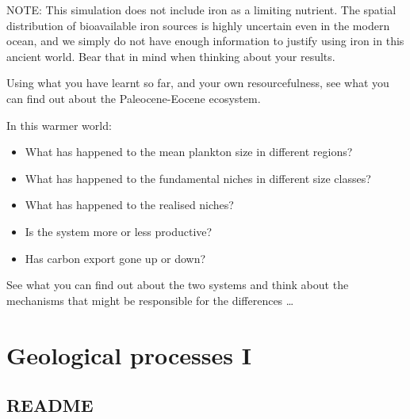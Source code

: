 \documentclass[11pt,fleqn]{book} %
\begin{document}
\noindent NOTE: This simulation does not include iron as a limiting nutrient. The spatial distribution of bioavailable iron sources is highly uncertain even in the modern ocean, and we simply do not have enough information to justify using iron in this ancient world. Bear that in mind when thinking about your results.

Using what you have learnt so far, and your own resourcefulness, see what you can find out about the Paleocene-Eocene ecosystem.

In this warmer world:

\vspace{2mm}
\begin{itemize}
\item What has happened to the mean plankton size in different regions?
\item What has happened to the fundamental niches in different size classes?
\item What has happened to the realised niches?
\item Is the system more or less productive?
\item Has carbon export gone up or down?
\end{itemize}
\vspace{2mm}

See what you can find out about the two systems and think about the mechanisms that might be responsible for the differences \dots


\cleardoublepage


\chapter{Geological processes I}

\hfill \break


\newpage


\section{README}
\end{document}
